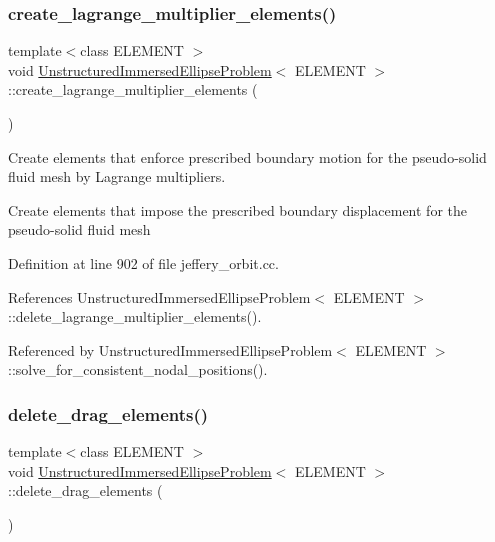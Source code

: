 \subsubsection{\texorpdfstring{create\+\_\+lagrange\+\_\+multiplier\+\_\+elements()}{create\_lagrange\_multiplier\_elements()}}
{\footnotesize\ttfamily template$<$class E\+L\+E\+M\+E\+NT $>$ \\
void \hyperlink{classUnstructuredImmersedEllipseProblem}{Unstructured\+Immersed\+Ellipse\+Problem}$<$ E\+L\+E\+M\+E\+NT $>$\+::create\+\_\+lagrange\+\_\+multiplier\+\_\+elements (\begin{DoxyParamCaption}{ }\end{DoxyParamCaption})\hspace{0.3cm}{\ttfamily [private]}}



Create elements that enforce prescribed boundary motion for the pseudo-\/solid fluid mesh by Lagrange multipliers. 

Create elements that impose the prescribed boundary displacement for the pseudo-\/solid fluid mesh 

Definition at line 902 of file jeffery\+\_\+orbit.\+cc.



References Unstructured\+Immersed\+Ellipse\+Problem$<$ E\+L\+E\+M\+E\+N\+T $>$\+::delete\+\_\+lagrange\+\_\+multiplier\+\_\+elements().



Referenced by Unstructured\+Immersed\+Ellipse\+Problem$<$ E\+L\+E\+M\+E\+N\+T $>$\+::solve\+\_\+for\+\_\+consistent\+\_\+nodal\+\_\+positions().

\mbox{\label{classUnstructuredImmersedEllipseProblem_a7d7b84968988d37091b29957b0af5bfa}} 
\subsubsection{\texorpdfstring{delete\+\_\+drag\+\_\+elements()}{delete\_drag\_elements()}}
{\footnotesize\ttfamily template$<$class E\+L\+E\+M\+E\+NT $>$ \\
void \hyperlink{classUnstructuredImmersedEllipseProblem}{Unstructured\+Immersed\+Ellipse\+Problem}$<$ E\+L\+E\+M\+E\+NT $>$\+::delete\+\_\+drag\+\_\+elements (\begin{DoxyParamCaption}{ }\end{DoxyParamCaption})\hspace{0.3cm}{\ttfamily [private]}}



